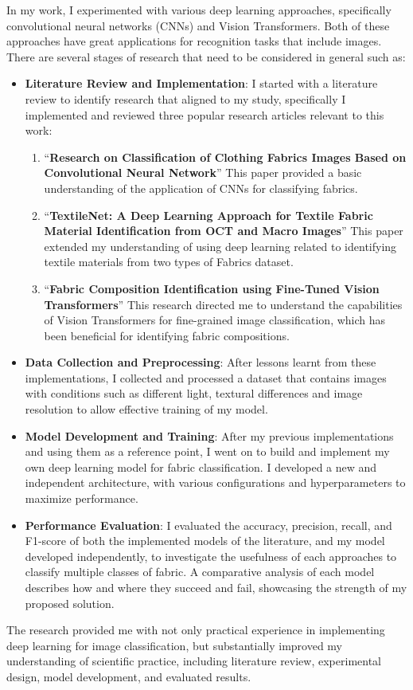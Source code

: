 In my work, I experimented with various deep learning approaches, specifically convolutional neural networks (CNNs) and Vision Transformers. Both of these approaches have great applications for recognition tasks that include images. There are several stages of research that need to be considered in general such as:
\begin{itemize}
    \item \textbf{Literature Review and Implementation}: I started with a literature review to identify research that aligned to my study, specifically I implemented and reviewed three popular research articles relevant to this work:
    \begin{enumerate}
        \item ``\textbf{Research on Classification of Clothing Fabrics Images Based on Convolutional Neural Network}'' This paper provided a basic understanding of the application of CNNs for classifying fabrics. 
        \item ``\textbf{TextileNet: A Deep Learning Approach for Textile Fabric Material Identification from OCT and Macro Images}'' This paper extended my understanding of using deep learning related to identifying textile materials from two types of Fabrics dataset.
        \item ``\textbf{Fabric Composition Identification using Fine-Tuned Vision Transformers}'' This research directed me to understand the capabilities of Vision Transformers for fine-grained image classification, which has been beneficial for identifying fabric compositions.
    \end{enumerate}
    \item \textbf{Data Collection and Preprocessing}: After lessons learnt from these implementations, I collected and processed a dataset that contains images with conditions such as different light, textural differences and image resolution to allow effective training of my model.
    \item \textbf{Model Development and Training}: After my previous implementations and using them as a reference point, I went on to build and implement my own deep learning model for fabric classification. I developed a new and independent architecture, with various configurations and hyperparameters to maximize performance.
    \item \textbf{Performance Evaluation}: I evaluated the accuracy, precision, recall, and F1-score of both the implemented models of the literature, and my model developed independently, to investigate the usefulness of each approaches to classify multiple classes of fabric. A comparative analysis of each model describes how and where they succeed and fail, showcasing the strength of my proposed solution.
\end{itemize}
The research provided me with not only practical experience in implementing deep learning for image classification, but substantially improved my understanding of scientific practice, including literature review, experimental design, model development, and evaluated results.

